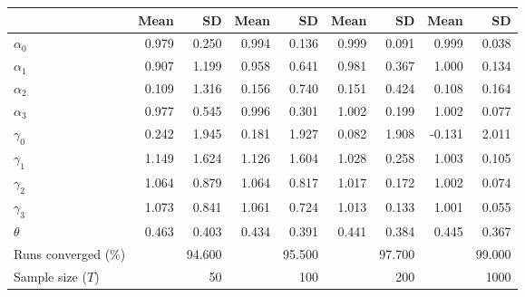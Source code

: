
\begin{tabular}[t]{lrrrrrrrr}
\toprule
  & Mean & SD & Mean  & SD  & Mean   & SD   & Mean    & SD   \\
\midrule
$\alpha_{0}$ & 0.979 & 0.250 & 0.994 & 0.136 & 0.999 & 0.091 & 0.999 & 0.038\\
$\alpha_{1}$ & 0.907 & 1.199 & 0.958 & 0.641 & 0.981 & 0.367 & 1.000 & 0.134\\
$\alpha_{2}$ & 0.109 & 1.316 & 0.156 & 0.740 & 0.151 & 0.424 & 0.108 & 0.164\\
$\alpha_{3}$ & 0.977 & 0.545 & 0.996 & 0.301 & 1.002 & 0.199 & 1.002 & 0.077\\
$\gamma_{0}$ & 0.242 & 1.945 & 0.181 & 1.927 & 0.082 & 1.908 & -0.131 & 2.011\\
$\gamma_{1}$ & 1.149 & 1.624 & 1.126 & 1.604 & 1.028 & 0.258 & 1.003 & 0.105\\
$\gamma_{2}$ & 1.064 & 0.879 & 1.064 & 0.817 & 1.017 & 0.172 & 1.002 & 0.074\\
$\gamma_{3}$ & 1.073 & 0.841 & 1.061 & 0.724 & 1.013 & 0.133 & 1.001 & 0.055\\
$\theta$ & 0.463 & 0.403 & 0.434 & 0.391 & 0.441 & 0.384 & 0.445 & 0.367\\
Runs converged (\%) &  & 94.600 &  & 95.500 &  & 97.700 &  & 99.000\\
Sample size ($T$) &  & 50 &  & 100 &  & 200 &  & 1000\\
\bottomrule
\end{tabular}
